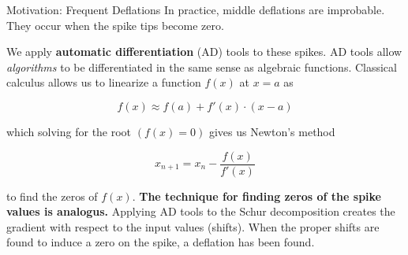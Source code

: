 \documentclass[final]{beamer}
\newlength{\onecolwid}
\newlength{\twocolwid}
\begin{document}
\begin{frame}[t]
\begin{columns}[t]
\begin{column}{\twocolwid}
\begin{columns}[t,totalwidth=\twocolwid]
\begin{column}{\onecolwid}
\begin{block}{Motivation: Frequent Deflations}
In practice, middle deflations are improbable. They occur when the spike tips
become zero.

\vspace{0.5ex}
\begin{figure}
\end{figure}
\vspace{0.5ex}

We apply \textbf{automatic differentiation} (AD) tools to these spikes. AD tools
allow \emph{algorithms} to be differentiated in the same sense as algebraic
functions. Classical calculus allows us to linearize a function $f(x)$ at $x=a$ as

\begin{equation*}
  f(x) \approx f(a) + f'(x) \cdot (x - a)
\end{equation*}

which solving for the root $(f(x) = 0)$ gives us Newton's method 

\begin{equation}
x_{n+1} = x_n - \frac{f(x)}{f'(x)}
\end{equation}

to find the zeros of $f(x)$. \textbf{The technique for finding zeros of the
spike values is analogus.} Applying AD tools to the Schur decomposition creates
the gradient with respect to the input values (shifts). When the proper shifts
are found to induce a zero on the spike, a deflation has been found.
\end{block}




\end{column}
\end{columns}
\end{column}
\end{columns}
\end{frame}
\end{document}
